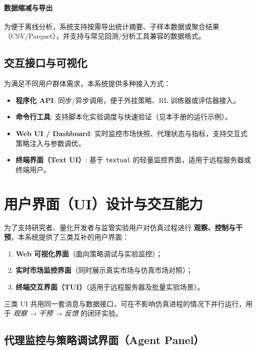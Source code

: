 \documentclass{mancls}
\begin{document}
\paragraph{数据缩减与导出}
为便于离线分析，系统支持按需导出统计摘要、子样本数据或聚合结果（CSV/Parquet），并支持与常见回测/分析工具兼容的数据格式。

\subsection{交互接口与可视化}
为满足不同用户群体需求，本系统提供多种接入方式：
\begin{itemize}
  \item \textbf{程序化 API}: 同步/异步调用，便于外挂策略、RL 训练器或评估器接入。
  \item \textbf{命令行工具}: 支持脚本化实验调度与快速验证（见本手册的运行示例）。
  \item \textbf{Web UI / Dashboard}: 实时监控市场快照、代理状态与指标，支持交互式策略注入与参数调优。
  \item \textbf{终端界面（Text UI）}: 基于 \texttt{textual} 的轻量监控界面，适用于远程服务器或终端用户。
\end{itemize}



\newpage 


\newpage 
\section{用户界面（UI）设计与交互能力}

为了支持研究者、量化开发者与监管实验用户对仿真过程进行 \textbf{观察、控制与干预}，本系统提供了三类互补的用户界面：

\begin{enumerate}
  \item \textbf{Web 可视化界面}（面向策略调试与实验监控）； 
  \item \textbf{实时市场监控界面}（同时展示真实市场与仿真市场对照）；  
  \item \textbf{终端交互界面（TUI）}（适用于远程服务器及批量实验场景）。
\end{enumerate}

三类 UI 共用同一套消息与数据接口，可在不影响仿真进程的情况下并行运行，用于 \emph{观察 → 干预 → 反馈} 的闭环实验。

\subsection{代理监控与策略调试界面（Agent Panel）}
\end{document}
